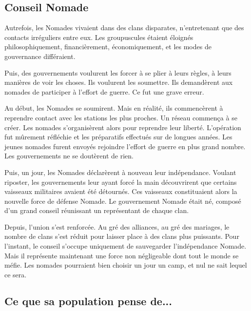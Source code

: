 \begin{multicols}{2}
\section{Conseil Nomade}

Autrefois, les Nomades vivaient dans des clans disparates, n'entretenant que des contacts irréguliers entre eux. Les groupuscules étaient éloignés philosophiquement, financièrement, économiquement, et les modes de gouvernance différaient. 

Puis, des gouvernements voulurent les forcer à se plier à leurs règles, à leurs manières de voir les choses. Ils voulurent les soumettre. Ils demandèrent aux nomades de participer à l'effort de guerre. Ce fut une grave erreur. 
 
Au début, les Nomades se soumirent. Mais en réalité, ils commencèrent à reprendre contact avec les stations les plus proches. Un réseau commença à se créer. Les nomades s'organisèrent alors pour reprendre leur liberté. L'opération fut mûrement réfléchie et les préparatifs effectués sur de longues années. Les jeunes nomades furent envoyés rejoindre l'effort de guerre en plus grand nombre. Les gouvernements ne se doutèrent de rien.

Puis, un jour, les Nomades déclarèrent à nouveau leur indépendance. Voulant riposter, les gouvernements leur ayant forcé la main découvrirent que certains vaisseaux militaires avaient été détournés. Ces vaisseaux constituaient alors la nouvelle force de défense Nomade. Le gouvernement Nomade était né, composé d'un grand conseil réunissant un représentant de chaque clan.

Depuis, l'union s'est renforcée. Au gré des alliances, au gré des mariages, le nombre de clans s'est réduit pour laisser place à des clans plus puissants. Pour l'instant, le conseil s'occupe uniquement de sauvegarder l'indépendance Nomade. Mais il représente maintenant une force non négligeable dont tout le monde se méfie. Les nomades pourraient bien choisir un jour un camp, et nul ne sait lequel ce sera.

\subsection{Ce que sa population pense de...}


\end{multicols}
